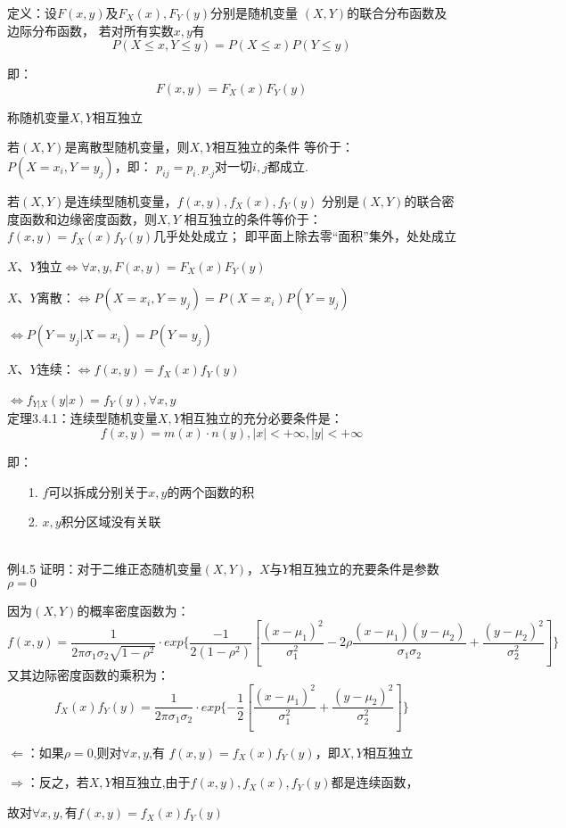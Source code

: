 定义：设$F(x,y)$及$F_X(x),F_Y(y)$分别是随机变量
$(X,Y)$的联合分布函数及边际分布函数，
若对所有实数$x,y$有
$$P(X\leq x,Y\leq y)=P(X\leq x)P(Y\leq y)$$

即：
$$F(x,y)=F_X(x)F_Y(y)$$


称随机变量$X,Y$相互独立


若$(X,Y)$是离散型随机变量，则$X,Y$相互独立的条件
等价于：$P(X=x_i,Y=y_j)$，即：
$p_{ij}=p_{i\cdot}p_{\cdot j}$对一切$i,j$都成立.


若$(X,Y)$是连续型随机变量，$f(x,y),f_X(x),f_Y(y)$
分别是$(X,Y)$的联合密度函数和边缘密度函数，则$X,Y$
相互独立的条件等价于：$f(x,y)=f_X(x)f_Y(y)$几乎处处成立；
即平面上除去零“面积”集外，处处成立

$X$、$Y$独立$\iff\forall x,y,F(x,y)=F_X(x)F_Y(y)$

$X$、$Y$离散：$\iff P(X=x_i,Y=y_j)=P(X=x_i)P(Y=y_j)$

$\iff P(Y=y_j|X=x_i)=P(Y=y_j)$

$X$、$Y$连续：$\iff f(x,y)=f_X(x)f_Y(y)$

$\iff f_{Y|X}(y|x)=f_Y(y),\forall x,y$
~\\

定理3.4.1：连续型随机变量$X,Y$相互独立的充分必要条件是：
$$f(x,y)=m(x)\cdot n(y),|x|<+\infty,|y|<+\infty$$

即：\begin{itemize}
    \item [1.]$f$可以拆成分别关于$x,y$的两个函数的积
    \item [2.]$x,y$积分区域没有关联
\end{itemize}
~\\

例4.5 证明：对于二维正态随机变量$(X,Y)$，$X$与$Y$相互独立的充要条件是参数$\rho=0$

因为$(X,Y)$的概率密度函数为：
$$f(x,y)=\dfrac{1}{2\pi\sigma_1\sigma_2\sqrt{1-\rho^2}}\cdot
exp\{\dfrac{-1}{2(1-\rho^2)}[\dfrac{(x-\mu_1)^2}{\sigma_1^2}-
2\rho\dfrac{(x-\mu_1)(y-\mu_2)}{\sigma_1\sigma_2}+
\dfrac{(y-\mu_2)^2}{\sigma_2^2}]\}$$
又其边际密度函数的乘积为：
$$f_X(x)f_Y(y)=\dfrac{1}{2\pi\sigma_1\sigma_2}\cdot
exp\{-\dfrac{1}{2}[\dfrac{(x-\mu_1)^2}{\sigma_1^2}+
\dfrac{(y-\mu_2)^2}{\sigma_2^2}]\}$$

$\Leftarrow$：如果$\rho=0$,则对$\forall x,y$,有
$f(x,y)=f_X(x)f_Y(y)$，即$X,Y$相互独立

$\Rightarrow$：反之，若$X,Y$相互独立,由于$f(x,y),f_X(x),f_Y(y)$都是连续函数，

故对$\forall x,y,$有$f(x,y)=f_X(x)f_Y(y)$

